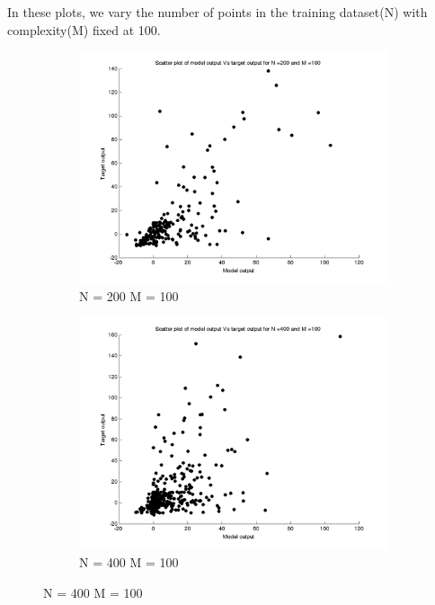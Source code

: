 \documentclass{article}
\begin{document}
\newpage
In these plots, we vary the number of points in the training dataset(N) with complexity(M) fixed at 100. 
\begin{figure}[H]

\begin{subfigure}{.5\textwidth}
\centering
\includegraphics[width=\linewidth]{D2/Scatter/VaryingN_N200M100}
\caption{N = 200 M = 100}
\end{subfigure}
\begin{subfigure}{.5\textwidth}
\includegraphics[width=\linewidth]{D2/Scatter/VaryingN_N400M100}
\caption{N = 400 M = 100}
\end{subfigure}



\end{figure}
\end{document}
